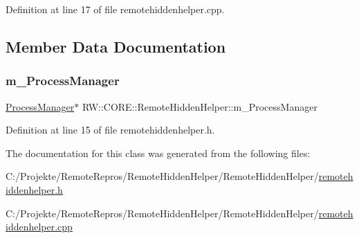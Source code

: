 Definition at line 17 of file remotehiddenhelper.\+cpp.



\subsection{Member Data Documentation}
\hypertarget{class_r_w_1_1_c_o_r_e_1_1_remote_hidden_helper_af8e698e8aaf6a6ff89f03691494c3165}{}\label{class_r_w_1_1_c_o_r_e_1_1_remote_hidden_helper_af8e698e8aaf6a6ff89f03691494c3165} 
\subsubsection{\texorpdfstring{m\+\_\+\+Process\+Manager}{m\_ProcessManager}}
{\footnotesize\ttfamily \hyperlink{class_r_w_1_1_c_o_r_e_1_1_process_manager}{Process\+Manager}$\ast$ R\+W\+::\+C\+O\+R\+E\+::\+Remote\+Hidden\+Helper\+::m\+\_\+\+Process\+Manager\hspace{0.3cm}{\ttfamily [private]}}



Definition at line 15 of file remotehiddenhelper.\+h.



The documentation for this class was generated from the following files\+:\begin{DoxyCompactItemize}
\item 
C\+:/\+Projekte/\+Remote\+Repros/\+Remote\+Hidden\+Helper/\+Remote\+Hidden\+Helper/\hyperlink{remotehiddenhelper_8h}{remotehiddenhelper.\+h}\item 
C\+:/\+Projekte/\+Remote\+Repros/\+Remote\+Hidden\+Helper/\+Remote\+Hidden\+Helper/\hyperlink{remotehiddenhelper_8cpp}{remotehiddenhelper.\+cpp}\end{DoxyCompactItemize}
